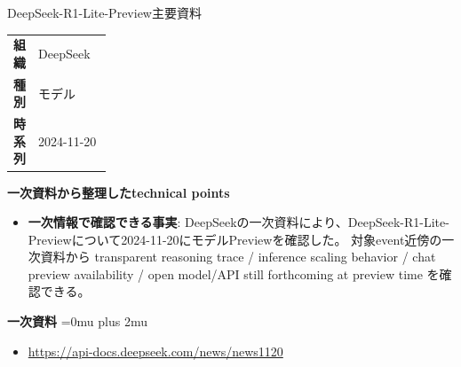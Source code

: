 \begin{technicalnote}{DeepSeek-R1-Lite-Preview}{主要資料}
\begingroup
\begin{tabularx}{\linewidth}{@{}>{\bfseries}p{0.22\linewidth}X@{}}
組織 & DeepSeek \\
種別 & モデル \\
時系列 & 2024-11-20 \\
\end{tabularx}
\smallskip
{\bfseries 一次資料から整理したtechnical points}
\begin{itemize}[leftmargin=1.5em,itemsep=0.35em]
\item \textbf{一次情報で確認できる事実}: DeepSeekの一次資料により、DeepSeek-R1-Lite-Previewについて2024-11-20にモデルPreviewを確認した。 対象event近傍の一次資料から transparent reasoning trace / inference scaling behavior / chat preview availability / open model/API still forthcoming at preview time を確認できる。
\end{itemize}
\begin{minipage}{\linewidth}
\begin{samepage}
{\bfseries 一次資料}
\begingroup\sloppy
\Urlmuskip=0mu plus 2mu\relax
\begin{itemize}[leftmargin=1.5em,itemsep=0.25em]
\item {\scriptsize\url{https://api-docs.deepseek.com/news/news1120}}
\end{itemize}
\endgroup
\end{samepage}
\end{minipage}
\endgroup
\end{technicalnote}
\medskip

